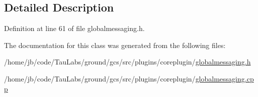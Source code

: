 \subsection{\-Detailed \-Description}


\-Definition at line 61 of file globalmessaging.\-h.



\-The documentation for this class was generated from the following files\-:\begin{DoxyCompactItemize}
\item 
/home/jb/code/\-Tau\-Labs/ground/gcs/src/plugins/coreplugin/\hyperlink{globalmessaging_8h}{globalmessaging.\-h}\item 
/home/jb/code/\-Tau\-Labs/ground/gcs/src/plugins/coreplugin/\hyperlink{globalmessaging_8cpp}{globalmessaging.\-cpp}\end{DoxyCompactItemize}
